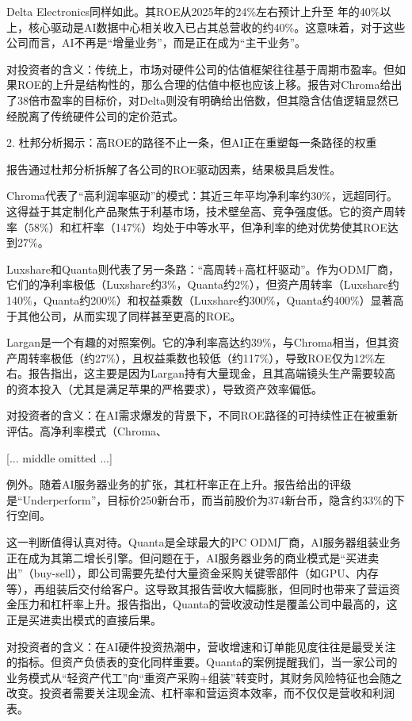 \documentclass[11pt]{ctexart}
\begin{document}
Delta Electronics同样如此。其ROE从2025年的24\%左右预计上升至 年的40\%以上，核心驱动是AI数据中心相关收入已占其总营收的约40\%。这意味着，对于这些公司而言，AI不再是“增量业务”，而是正在成为“主干业务”。

对投资者的含义：传统上，市场对硬件公司的估值框架往往基于周期市盈率。但如果ROE的上升是结构性的，那么合理的估值中枢也应该上移。报告对Chroma给出了38倍市盈率的目标价，对Delta则没有明确给出倍数，但其隐含估值逻辑显然已经脱离了传统硬件公司的定价范式。

2. 杜邦分析揭示：高ROE的路径不止一条，但AI正在重塑每一条路径的权重

报告通过杜邦分析拆解了各公司的ROE驱动因素，结果极具启发性。

Chroma代表了“高利润率驱动”的模式：其近三年平均净利率约30\%，远超同行。这得益于其定制化产品聚焦于利基市场，技术壁垒高、竞争强度低。它的资产周转率（58\%）和杠杆率（147\%）均处于中等水平，但净利率的绝对优势使其ROE达到27\%。

Luxshare和Quanta则代表了另一条路：“高周转+高杠杆驱动”。作为ODM厂商，它们的净利率极低（Luxshare约3\%，Quanta约2\%），但资产周转率（Luxshare约140\%，Quanta约200\%）和权益乘数（Luxshare约300\%，Quanta约400\%）显著高于其他公司，从而实现了同样甚至更高的ROE。

Largan是一个有趣的对照案例。它的净利率高达约39\%，与Chroma相当，但其资产周转率极低（约27\%），且权益乘数也较低（约117\%），导致ROE仅为12\%左右。报告指出，这主要是因为Largan持有大量现金，且其高端镜头生产需要较高的资本投入（尤其是满足苹果的严格要求），导致资产效率偏低。

对投资者的含义：在AI需求爆发的背景下，不同ROE路径的可持续性正在被重新评估。高净利率模式（Chroma、

[... middle omitted ...]

例外。随着AI服务器业务的扩张，其杠杆率正在上升。报告给出的评级是“Underperform”，目标价250新台币，而当前股价为374新台币，隐含约33\%的下行空间。

这一判断值得认真对待。Quanta是全球最大的PC ODM厂商，AI服务器组装业务正在成为其第二增长引擎。但问题在于，AI服务器业务的商业模式是“买进卖出”（buy-sell），即公司需要先垫付大量资金采购关键零部件（如GPU、内存等），再组装后交付给客户。这导致其报告营收大幅膨胀，但同时也带来了营运资金压力和杠杆率上升。报告指出，Quanta的营收波动性是覆盖公司中最高的，这正是买进卖出模式的直接后果。

对投资者的含义：在AI硬件投资热潮中，营收增速和订单能见度往往是最受关注的指标。但资产负债表的变化同样重要。Quanta的案例提醒我们，当一家公司的业务模式从“轻资产代工”向“重资产采购+组装”转变时，其财务风险特征也会随之改变。投资者需要关注现金流、杠杆率和营运资本效率，而不仅仅是营收和利润表。
\end{document}
